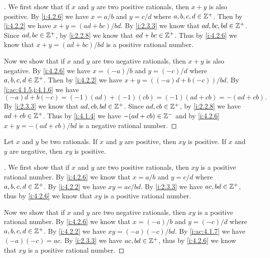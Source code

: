 \begin{proof}[]
  We first show that if \(x\) and \(y\) are two positive rationals, then \(x + y\) is also positive.
  By \cref{i:4.2.6} we have \(x = a / b\) and \(y = c / d\) where \(a, b, c, d \in \mathbb{Z}^+\).
  Then by \cref{i:4.2.2} we have \(x + y = (ad + bc) / bd\).
  By \cref{i:2.3.3} we know that \(ad, bc, bd \in \mathbb{Z}^+\).
  Since \(ad, bc \in \mathbb{Z}^+\), by \cref{i:2.2.8} we know that \(ad + bc \in \mathbb{Z}^+\).
  Thus by \cref{i:4.2.6} we know that \(x + y = (ad + bc) / bd\) is a positive rational number.

  Now we show that if \(x\) and \(y\) are two negative rationals, then \(x + y\) is also negative.
  By \cref{i:4.2.6} we have \(x = (-a) / b\) and \(y = (-c) / d\) where \(a, b, c, d \in \mathbb{Z}^+\).
  Then by \cref{i:4.2.2} we have \(x + y = ((-a)d + b(-c)) / bd\).
  By \cref{i:ac:4.1.5,i:4.1.6} we have
  \[
    (-a)d + b(-c) = (-1) (ad) + (-1) (cb) = (-1)(ad + cb) = -(ad + cb).
  \]
  By \cref{i:2.3.3} we know that \(ad, cb, bd \in \mathbb{Z}^+\).
  Since \(ad, cb \in \mathbb{Z}^+\), by \cref{i:2.2.8} we have \(ad + cb \in \mathbb{Z}^+\).
  Thus by \cref{i:4.1.4} we have \(-(ad + cb) \in \mathbb{Z}^-\) and by \cref{i:4.2.6} \(x + y = -(ad + cb) / bd\) is a negative rational number.
\end{proof}

\begin{ac}\label{i:ac:4.2.7}
  Let \(x\) and \(y\) be two rationals.
  If \(x\) and \(y\) are positive, then \(xy\) is positive.
  If \(x\) and \(y\) are negative, then \(xy\) is positive.
\end{ac}

\begin{proof}[]
  We first show that if \(x\) and \(y\) are two positive rationals, then \(xy\) is a positive rational number.
  By \cref{i:4.2.6} we know that \(x = a / b\) and \(y = c / d\) where \(a, b, c, d \in \mathbb{Z}^+\).
  By \cref{i:4.2.2} we have \(xy = ac / bd\).
  By \cref{i:2.3.3} we have \(ac, bd \in \mathbb{Z}^+\), thus by \cref{i:4.2.6} we know that \(xy\) is a positive rational number.

  Now we show that if \(x\) and \(y\) are two negative rationals, then \(xy\) is a positive rational number.
  By \cref{i:4.2.6} we know that \(x = (-a) / b\) and \(y = (-c) / d\) where \(a, b, c, d \in \mathbb{Z}^+\).
  By \cref{i:4.2.2} we have \(xy = (-a)(-c) / bd\).
  By \cref{i:ac:4.1.7} we have \((-a)(-c) = ac\).
  By \cref{i:2.3.3} we have \(ac, bd \in \mathbb{Z}^+\), thus by \cref{i:4.2.6} we know that \(xy\) is a positive rational number.
\end{proof}

